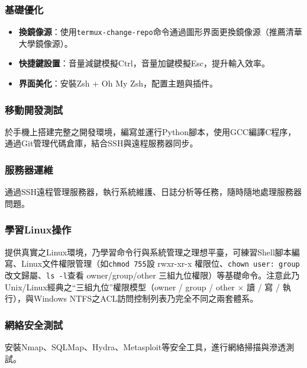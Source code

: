 \subsubsection*{基礎優化}

\begin{itemize}
  \item \textbf{換鏡像源}：使用\texttt{termux-\allowbreak change-\allowbreak repo}命令通過圖形界面更換鏡像源（推薦清華大學鏡像源）。
  \item \textbf{快捷鍵設置}：音量減鍵模擬Ctrl，音量加鍵模擬Esc，提升輸入效率。
  \item \textbf{界面美化}：安裝Zsh + Oh My Zsh，配置主題與插件。
\end{itemize}


\subsubsection*{移動開發測試}

於手機上搭建完整之開發環境，編寫並運行Python腳本，使用GCC編譯C程序，通過Git管理代碼倉庫，結合SSH與遠程服務器同步。

\subsubsection*{服務器運維}

通過SSH遠程管理服務器，執行系統維護、日誌分析等任務，隨時隨地處理服務器問題。

\subsubsection*{學習Linux操作}

提供真實之Linux環境，乃學習命令行與系統管理之理想平臺，可練習Shell腳本編寫、Linux文件權限管理（如\texttt{chmod 755}設 rwxr-xr-x 權限位、\texttt{chown user: group}改文歸屬、\texttt{ls -\allowbreak l}查看 owner/group/other 三組九位權限）等基礎命令。注意此乃Unix/Linux經典之“三組九位”權限模型（owner / group / other × 讀 / 寫 / 執行），與Windows NTFS之ACL訪問控制列表乃完全不同之兩套體系。

\subsubsection*{網絡安全測試}

安裝Nmap、SQLMap、Hydra、Metasploit等安全工具，進行網絡掃描與滲透測試。


